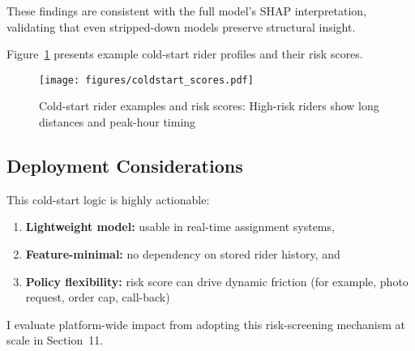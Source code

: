 These findings are consistent with the full model's SHAP interpretation, validating that even stripped-down models preserve structural insight.

Figure~\ref{fig:coldstart_examples} presents example cold-start rider profiles and their risk scores.

\begin{figure}[H]
\centering
\texttt{[image: figures/coldstart\_scores.pdf]}
\caption{Cold-start rider examples and risk scores: High-risk riders show long distances and peak-hour timing}
\label{fig:coldstart_examples}
\end{figure}

\subsection{Deployment Considerations}

This cold-start logic is highly actionable:

\begin{enumerate}
    \item \textbf{Lightweight model:} usable in real-time assignment systems,
    \item \textbf{Feature-minimal:} no dependency on stored rider history, and
    \item \textbf{Policy flexibility:} risk score can drive dynamic friction (for example, photo request, order cap, call-back)
\end{enumerate}

I evaluate platform-wide impact from adopting this risk-screening mechanism at scale in Section~11.